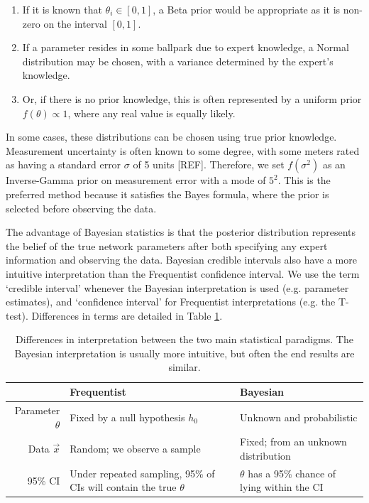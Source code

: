 \documentclass[a4paper, 12pt]{article}
\begin{document}
\begin{enumerate}
\item If it is known that $\theta_i \in [0,1]$, a Beta prior would be appropriate as it is non-zero on the interval $[0, 1]$. 
\item If a parameter resides in some ballpark due to expert knowledge, a Normal distribution may be chosen, with a variance determined by the expert's knowledge.
\item Or, if there is no prior knowledge, this is often represented by a uniform prior $f(\theta)\propto 1$, where any real value is equally likely.
\end{enumerate}

In some cases, these distributions can be chosen using true prior knowledge. Measurement uncertainty is often known to some degree, with some meters rated as having a standard error $\sigma$ of 5 units [REF]. Therefore, we set $f(\sigma^2)$ as an Inverse-Gamma prior on measurement error with a mode of $5^2$. This is the preferred method because it satisfies the Bayes formula, where the prior is selected before observing the data.

The advantage of Bayesian statistics is that the posterior distribution represents the belief of the true network parameters after both specifying any expert information and observing the data. Bayesian credible intervals also have a more intuitive interpretation than the Frequentist confidence interval. We use the term `credible interval' whenever the Bayesian interpretation is used (e.g. parameter estimates), and `confidence interval' for Frequentist interpretations (e.g. the T-test). Differences in terms are detailed in Table \ref{tab:ci}.

\begin{table}
\centering
\begin{tabularx}{0.85\linewidth}{rXX}
\hline
 & Frequentist & Bayesian \\ 
  \hline
Parameter $\theta$ & Fixed by a null hypothesis $h_0$ & Unknown and probabilistic \\\hline
Data $\vec{x}$ & Random; we observe a sample & Fixed; from an unknown distribution \\\hline
95\% CI & Under repeated sampling, 95\% of CIs will contain the true $\theta$ & $\theta$ has a 95\% chance of lying within the CI  \\
   \hline
\end{tabularx}
\caption{Differences in interpretation between the two main statistical paradigms. The Bayesian interpretation is usually more intuitive, but often the end results are similar.}
\label{tab:ci}
\end{table}
\end{document}
